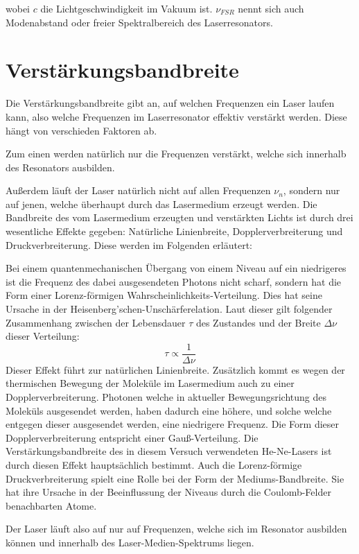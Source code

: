 \documentclass[bigchapter,colorback,accentcolor=tud4b,linedtoc,11pt]{tudreport}
\numberwithin{equation}{subsection}
\begin{document}
wobei $c$ die Lichtgeschwindigkeit im Vakuum ist. $\nu_{FSR}$ nennt sich auch Modenabstand oder freier Spektralbereich des Laserresonators.

\section{Verstärkungsbandbreite}

Die Verstärkungsbandbreite gibt an, auf welchen Frequenzen ein Laser laufen kann, also welche Frequenzen im Laserresonator effektiv verstärkt werden. Diese hängt von verschieden Faktoren ab.

Zum einen werden natürlich nur die Frequenzen verstärkt, welche sich innerhalb des Resonators ausbilden.

Außerdem läuft der Laser natürlich nicht auf allen Frequenzen $\nu_n$, sondern nur auf jenen, welche überhaupt durch das Lasermedium erzeugt werden. Die Bandbreite des vom Lasermedium erzeugten und verstärkten Lichts ist durch drei wesentliche Effekte gegeben: Natürliche Linienbreite, Dopplerverbreiterung und Druckverbreiterung. Diese werden im Folgenden erläutert:

Bei einem quantenmechanischen Übergang von einem Niveau auf ein niedrigeres ist die Frequenz des dabei ausgesendeten Photons nicht scharf, sondern hat die Form einer Lorenz-förmigen Wahrscheinlichkeits-Verteilung. Dies hat seine Ursache in der Heisenberg'schen-Unschärferelation. Laut dieser gilt folgender Zusammenhang zwischen der Lebensdauer $\tau$ des Zustandes und der Breite $\Delta\nu$ dieser Verteilung:
$$ \tau \propto \frac{1}{\Delta\nu} $$
Dieser Effekt führt zur natürlichen Linienbreite.
Zusätzlich kommt es wegen der thermischen Bewegung der Moleküle im Lasermedium auch zu einer Dopplerverbreiterung. Photonen welche in aktueller Bewegungsrichtung des Moleküls ausgesendet werden, haben dadurch eine höhere, und solche welche entgegen dieser ausgesendet werden, eine niedrigere Frequenz. Die Form dieser Dopplerverbreiterung entspricht einer Gauß-Verteilung. Die Verstärkungsbandbreite des in diesem Versuch verwendeten He-Ne-Lasers ist durch diesen Effekt hauptsächlich bestimmt.
Auch die Lorenz-förmige Druckverbreiterung spielt eine Rolle bei der Form der Mediums-Bandbreite. Sie hat ihre Ursache in der Beeinflussung der Niveaus durch die Coulomb-Felder benachbarten Atome.

Der Laser läuft also auf nur auf Frequenzen, welche sich im Resonator ausbilden können und innerhalb des Laser-Medien-Spektrums liegen.
\end{document}
